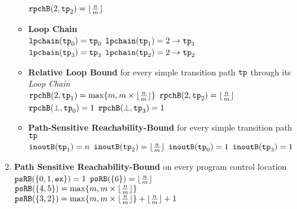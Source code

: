 \begin{enumerate}
\begin{itemize}
  $\mathtt{rpchB}(2, \mathtt{tp}_2) = \lfloor\frac{n}{m}\rfloor$ 
  \item \textbf{Loop Chain}
  \\
  $\mathtt{lpchain}(\mathtt{tp}_0) = \mathtt{tp}_0$ \qquad
  $\mathtt{lpchain}(\mathtt{tp}_1) = 2\to \mathtt{tp}_1$ \\
  $\mathtt{lpchain}(\mathtt{tp}_3) = \mathtt{tp}_3$ \qquad
  $\mathtt{lpchain}(\mathtt{tp}_2) = 2\to \mathtt{tp}_2$ 
  \item \textbf{{Relative Loop Bound}} for every simple transition path $\mathtt{tp}$ through its \emph{Loop Chain}
  \\
  $\mathtt{rpchB}(2, \mathtt{tp}_1) = \max\{m, m \times \lfloor\frac{n}{m}\rfloor\}$ \quad
  $\mathtt{rpchB}(2, \mathtt{tp}_2) = \lfloor\frac{n}{m}\rfloor$  \\
  $\mathtt{rpchB}(\bot, \mathtt{tp}_0) = 1$ \quad
  $\mathtt{rpchB}(\bot, \mathtt{tp}_3) = 1$ 
  \item \textbf{Path-Sensitive Reachability-Bound} for every simple transition path $\mathtt{tp}$
  \\
  $\mathtt{inoutB}(\mathtt{tp}_1) = n$ \quad
  $\mathtt{inoutB}(\mathtt{tp}_2) = \lfloor\frac{n}{m}\rfloor$ \quad
  $\mathtt{inoutB}(\mathtt{tp}_0) = 1$ \quad
  $\mathtt{inoutB}(\mathtt{tp}_3) = 1$ 
\end{itemize}
\item \textbf{Path Sensitive Reachability-Bound} on every program control location
\\
$\mathtt{psRB}(\{0, 1, \mathtt{ex}\}) = 1$ \qquad
$\mathtt{psRB}(\{6 \}) = \lfloor\frac{n}{m}\rfloor$ \\
$\mathtt{psRB}(\{4, 5 \}) = \max\{m, m \times \lfloor\frac{n}{m}\rfloor\}$ \quad
$\mathtt{psRB}(\{3, 2 \}) = \max\{m, m \times \lfloor\frac{n}{m}\rfloor\} + \lfloor\frac{n}{m}\rfloor + 1 $ \\
\end{enumerate}